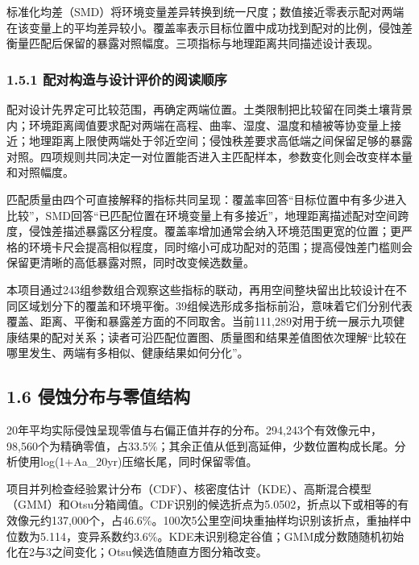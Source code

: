 \documentclass[
  11pt,
  a4paper,
]{ctexart}
\begin{document}
标准化均差（SMD）将环境变量差异转换到统一尺度；数值接近零表示配对两端在该变量上的平均差异较小。覆盖率表示目标位置中成功找到配对的比例，侵蚀差衡量匹配后保留的暴露对照幅度。三项指标与地理距离共同描述设计表现。

\hypertarget{ux914dux5bf9ux6784ux9020ux4e0eux8bbeux8ba1ux8bc4ux4ef7ux7684ux9605ux8bfbux987aux5e8f}{%
\subsubsection{1.5.1
配对构造与设计评价的阅读顺序}\label{ux914dux5bf9ux6784ux9020ux4e0eux8bbeux8ba1ux8bc4ux4ef7ux7684ux9605ux8bfbux987aux5e8f}}

配对设计先界定可比较范围，再确定两端位置。土类限制把比较留在同类土壤背景内；环境距离阈值要求配对两端在高程、曲率、湿度、温度和植被等协变量上接近；地理距离上限使两端处于邻近空间；侵蚀秩差要求高低端之间保留足够的暴露对照。四项规则共同决定一对位置能否进入主匹配样本，参数变化则会改变样本量和对照幅度。

匹配质量由四个可直接解释的指标共同呈现：覆盖率回答``目标位置中有多少进入比较''，SMD回答``已匹配位置在环境变量上有多接近''，地理距离描述配对空间跨度，侵蚀差描述暴露区分程度。覆盖率增加通常会纳入环境范围更宽的位置；更严格的环境卡尺会提高相似程度，同时缩小可成功配对的范围；提高侵蚀差门槛则会保留更清晰的高低暴露对照，同时改变候选数量。

本项目通过243组参数组合观察这些指标的联动，再用空间整块留出比较设计在不同区域划分下的覆盖和环境平衡。39组候选形成多指标前沿，意味着它们分别代表覆盖、距离、平衡和暴露差方面的不同取舍。当前111,289对用于统一展示九项健康结果的配对关系；读者可沿匹配位置图、质量图和结果差值图依次理解``比较在哪里发生、两端有多相似、健康结果如何分化''。

\hypertarget{ux4fb5ux8680ux5206ux5e03ux4e0eux96f6ux503cux7ed3ux6784}{%
\subsection{1.6
侵蚀分布与零值结构}\label{ux4fb5ux8680ux5206ux5e03ux4e0eux96f6ux503cux7ed3ux6784}}

20年平均实际侵蚀呈现零值与右偏正值并存的分布。294,243个有效像元中，98,560个为精确零值，占33.5\%；其余正值从低到高延伸，少数位置构成长尾。分析使用log(1+Aa\_20yr)压缩长尾，同时保留零值。

项目并列检查经验累计分布（CDF）、核密度估计（KDE）、高斯混合模型（GMM）和Otsu分箱阈值。CDF识别的候选折点为5.0502，折点以下或相等的有效像元约137,000个，占46.6\%。100次5公里空间块重抽样均识别该折点，重抽样中位数为5.114，变异系数约3.6\%。KDE未识别稳定谷值；GMM成分数随随机初始化在2与3之间变化；Otsu候选值随直方图分箱改变。
\end{document}
